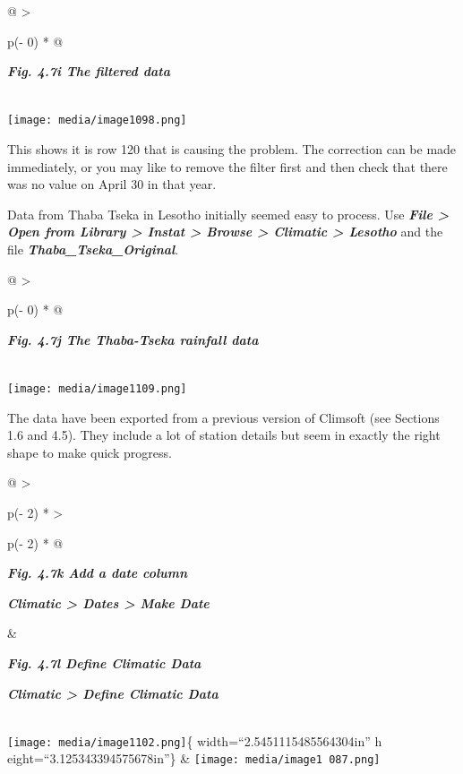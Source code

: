 \documentclass[
  letterpaper,
  DIV=11,
  numbers=noendperiod]{scrreprt}
\begin{document}
\begin{longtable}[]{@{}
  >{\raggedright\arraybackslash}p{(\columnwidth - 0\tabcolsep) * }@{}}
\toprule\noalign{}
\begin{minipage}[b]{\linewidth}\raggedright
\textbf{\emph{Fig. 4.7i The filtered data}}
\end{minipage} \\
\midrule\noalign{}
\endhead
\bottomrule\noalign{}
\endlastfoot
\texttt{[image: media/image1098.png]} \\
\end{longtable}

This shows it is row 120 that is causing the problem. The correction can
be made immediately, or you may like to remove the filter first and then
check that there was no value on April 30 in that year.

Data from Thaba Tseka in Lesotho initially seemed easy to process. Use
\textbf{\emph{File \textgreater{} Open from Library \textgreater{}
Instat \textgreater{} Browse \textgreater{} Climatic \textgreater{}
Lesotho}} and the file \textbf{\emph{Thaba\_Tseka\_Original}}.

\begin{longtable}[]{@{}
  >{\raggedright\arraybackslash}p{(\columnwidth - 0\tabcolsep) * }@{}}
\toprule\noalign{}
\begin{minipage}[b]{\linewidth}\raggedright
\textbf{\emph{Fig. 4.7j The Thaba-Tseka rainfall data}}
\end{minipage} \\
\midrule\noalign{}
\endhead
\bottomrule\noalign{}
\endlastfoot
\texttt{[image: media/image1109.png]} \\
\end{longtable}

The data have been exported from a previous version of Climsoft (see
Sections 1.6 and 4.5). They include a lot of station details but seem in
exactly the right shape to make quick progress.

\begin{longtable}[]{@{}
  >{\raggedright\arraybackslash}p{(\columnwidth - 2\tabcolsep) * }
  >{\raggedright\arraybackslash}p{(\columnwidth - 2\tabcolsep) * }@{}}
\toprule\noalign{}
\begin{minipage}[b]{\linewidth}\raggedright
\textbf{\emph{Fig. 4.7k Add a date column}}

\textbf{\emph{Climatic \textgreater{} Dates \textgreater{} Make Date}}
\end{minipage} & \begin{minipage}[b]{\linewidth}\raggedright
\textbf{\emph{Fig. 4.7l Define Climatic Data}}

\textbf{\emph{Climatic \textgreater{} Define Climatic Data}}
\end{minipage} \\
\midrule\noalign{}
\endhead
\bottomrule\noalign{}
\endlastfoot
\texttt{[image: media/image1102.png]}\{ width=``2.5451115485564304in'' h
eight=``3.125343394575678in''\} &
\texttt{[image: media/image1 087.png]} \\
\end{longtable}
\end{document}
